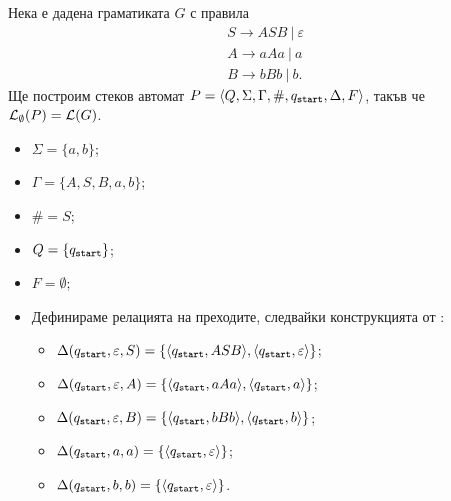 \begin{example}
  Нека е дадена граматиката $G$ с правила 
  \begin{align*}
    & S \to ASB\ |\ \varepsilon\\
    & A \to aAa\ |\ a\\
    & B \to bBb\ |\ b.
  \end{align*}
  Ще построим стеков автомат $P = \langle{Q,\Sigma,\Gamma,\#,q_{\texttt{start}},\Delta,F}\rangle$, такъв че $\mathcal{L}_\emptyset(P) = \mathcal{L}(G)$.
  \begin{itemize}
  \item
    $\Sigma = \{a,b\}$;
  \item 
    $\Gamma = \{A,S,B,a,b\}$;
  \item
    $\# = S$;
  \item
    $Q = \{q_{\texttt{start}}\}$;
  \item
    $F = \emptyset$;
  \item
    Дефинираме релацията на преходите, следвайки конструкцията от :
    \begin{itemize}
    \item 
      $\Delta(q_{\texttt{start}},\varepsilon, S) = \{\langle{q_{\texttt{start}},ASB}\rangle, \langle{q_{\texttt{start}},\varepsilon}\rangle\}$;
    \item
      $\Delta(q_{\texttt{start}}, \varepsilon, A) = \{\langle{q_{\texttt{start}}, aAa}\rangle, \langle{q_{\texttt{start}}, a}\rangle\}$;
    \item
      $\Delta(q_{\texttt{start}}, \varepsilon, B) = \{\langle{q_{\texttt{start}}, bBb}\rangle, \langle{q_{\texttt{start}}, b}\rangle\}$;
    \item
      $\Delta(q_{\texttt{start}}, a, a) = \{\langle{q_{\texttt{start}},\varepsilon}\rangle\}$;
    \item
      $\Delta(q_{\texttt{start}}, b, b) = \{\langle{q_{\texttt{start}},\varepsilon}\rangle\}$.
    \end{itemize}
  \end{itemize}
\end{example}


